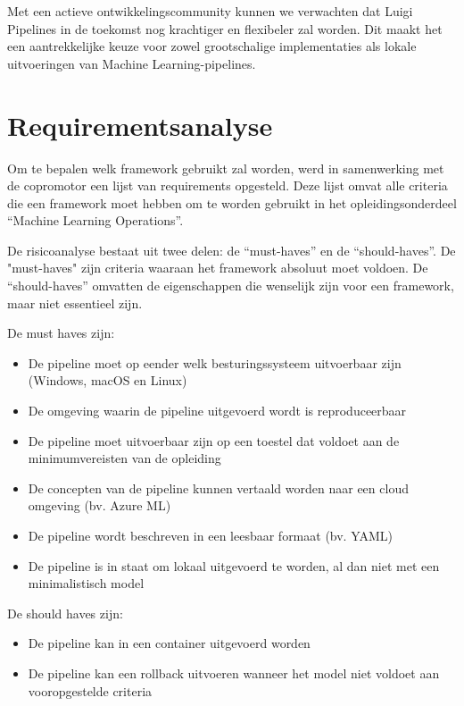 Met een actieve ontwikkelingscommunity kunnen we verwachten dat Luigi Pipelines in de toekomst nog krachtiger en flexibeler zal worden. Dit maakt het een aantrekkelijke keuze voor zowel grootschalige implementaties als lokale uitvoeringen van Machine Learning-pipelines.


\section{Requirementsanalyse}

Om te bepalen welk framework gebruikt zal worden, werd in samenwerking met de copromotor een lijst van requirements opgesteld. Deze lijst omvat alle criteria die een framework moet hebben om te worden gebruikt in het opleidingsonderdeel ``Machine Learning Operations''.


De risicoanalyse bestaat uit twee delen: de ``must-haves'' en de ``should-haves''. De "must-haves" zijn criteria waaraan het framework absoluut moet voldoen. De ``should-haves'' omvatten de eigenschappen die wenselijk zijn voor een framework, maar niet essentieel zijn.

De must haves zijn:
\begin{itemize}
    \item De pipeline moet op eender welk besturingssysteem uitvoerbaar zijn (Windows, macOS en Linux)
    \item De omgeving waarin de pipeline uitgevoerd wordt is reproduceerbaar
    \item De pipeline moet uitvoerbaar zijn op een toestel dat voldoet aan de minimumvereisten van de opleiding
    \item De concepten van de pipeline kunnen vertaald worden naar een cloud omgeving (bv. Azure ML)
    \item De pipeline wordt beschreven in een leesbaar formaat (bv. YAML)
    \item De pipeline is in staat om lokaal uitgevoerd te worden, al dan niet met een minimalistisch model
\end{itemize}
De should haves zijn:
\begin{itemize}
    \item De pipeline kan in een container uitgevoerd worden
    \item De pipeline kan een rollback uitvoeren wanneer het model niet voldoet aan vooropgestelde criteria
\end{itemize}

